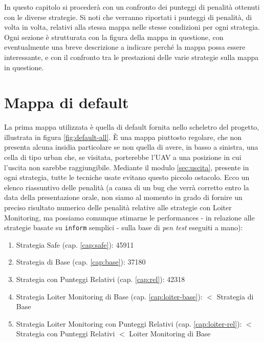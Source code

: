 In questo capitolo si procederà con un confronto dei punteggi di penalità ottenuti con le diverse strategie. Si noti che verranno riportati i punteggi di penalità, di volta in volta, relativi alla stessa mappa nelle stesse condizioni per ogni strategia. Ogni sezione è strutturata con la figura della mappa in questione, con eventualmente una breve descrizione a indicare perché la mappa possa essere interessante, e con il confronto tra le prestazioni delle varie strategie sulla mappa in questione.

\section{Mappa di default}
La prima mappa utilizzata è quella di default fornita nello scheletro del progetto, illustrata in figura \ref{fig:default-all}. È una mappa piuttosto regolare, che non presenta alcuna insidia particolare se non quella di avere, in basso a sinistra, una cella di tipo urban che, se visitata, porterebbe l'UAV a una posizione in cui l'uscita non sarebbe raggiungibile. Mediante il modulo \ref{sec:uscita}, presente in ogni strategia, tutte le tecniche usate evitano questo piccolo ostacolo. Ecco un elenco riassuntivo delle penalità (a causa di un bug che verrà corretto entro la data della presentazione orale, non siamo al momento in grado di fornire un preciso risultato numerico delle penalità relative alle strategie con Loiter Monitoring, ma possiamo comunque stimarne le performances - in relazione alle strategie basate su \texttt{inform} semplici - sulla base di \emph{pen test} eseguiti a mano):
\begin{enumerate}
	\item Strategia Safe (cap. \ref{cap:safe}): 45911
	\item Strategia di Base (cap. \ref{cap:base}): 37180
	\item Strategia con Punteggi Relativi (cap. \ref{cap:rel}): 42318
	\item Strategia Loiter Monitoring di Base (cap. \ref{cap:loiter-base}): $<$ Strategia di Base
	\item Strategia Loiter Monitoring con Punteggi Relativi (cap. \ref{cap:loiter-rel}): $<$ Strategia con Punteggi Relativi $<$ Loiter Monitoring di Base
\end{enumerate}

